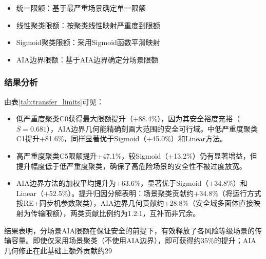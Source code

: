 
\begin{itemize}
    \item 统一限额：基于最严重场景确定单一限额
    \item 线性聚类限额：按聚类线性映射严重度到限额
    \item Sigmoid聚类限额：采用Sigmoid函数平滑映射
    \item AIA边界限额：基于AIA边界确定分场景限额
\end{itemize}

\subsubsection{结果分析}

由表\ref{tab:transfer_limits}可见：
\begin{itemize}
    \item 低严重度聚类C0获得最大限额提升（+88.4\%），因为其安全裕度充裕（$\bar{S}=0.681$），AIA边界几何能精确刻画大范围的安全可行域。中低严重度聚类C1提升+81.6\%，同样显著优于Sigmoid（+45.0\%）和Linear方法。
    \item 高严重度聚类C5限额提升+47.1\%，较Sigmoid（+13.2\%）仍有显著增益，但提升幅度低于低严重度聚类，确保了高危险场景的安全性不被过度放宽。
    \item AIA边界方法的加权平均提升为+63.6\%，显著优于Sigmoid（+34.8\%）和Linear（+52.5\%）。提升归因分解表明：场景聚类贡献约+34.8\%（将运行方式按RE+同步机参数聚类），AIA边界几何贡献约+28.8\%（安全域多面体直接映射为传输限额），两类贡献比例约为1.2:1，互补而非冗余。
\end{itemize}

结果表明，分场景AIA限额在保证安全的前提下，有效释放了各风险等级场景的传输容量。即使仅采用场景聚类（不使用AIA边界），即可获得约35\%的提升；AIA几何修正在此基础上额外贡献约29%
